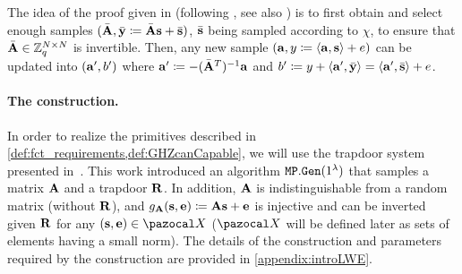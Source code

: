 {  The idea of the proof given in \cite[Lem.~2]{ACPS_2009_Fast_crypto_circular_enc} (following \cite{MR_2009_lattice_based_crypto}, see also \cite[p.~23]{peikert2016decade}) is to first obtain and select enough samples $(\bar{\mathbf{A}}, \bar{\mathbf{y}} \coloneqq \bar{\mathbf{A}} \mathbf{s} + \bar{\mathbf{s}})$, $\bar{\mathbf{s}}$ being sampled according to $\chi$, to ensure that $\bar{\mathbf{A}} \in \mathbb{Z}_q^{N \times N}$ is invertible. Then, any new sample $(\mathbf{a}, y \coloneqq \langle \mathbf{a}, \mathbf{s}\rangle + e)$ can be updated into $(\mathbf{a}', b')$ where $\mathbf{a}' \coloneqq -(\bar{\mathbf{A}}^T)^{-1}\mathbf{a}$ and $b' \coloneqq y + \langle \mathbf{a}', \bar{\mathbf{y}} \rangle = \langle \mathbf{a}', \bar{\mathbf{s}} \rangle + e$.
}

\paragraph{The \cite{MP11} construction.}

In order to realize the primitives described in \cref{def:fct_requirements,def:GHZcanCapable}, we will use the trapdoor system presented in~\cite{MP11}. This work introduced an algorithm ${\tt MP.Gen}(1^\lambda)$ that samples a matrix $\mathbf{A}$ and a trapdoor $\mathbf{R}$. In addition, $\mathbf{A}$ is indistinguishable from a random matrix (without $\mathbf{R}$), and $g_{\mathbf{A}}(\mathbf{s}, \mathbf{e}) \coloneqq \mathbf{A}\mathbf{s}+\mathbf{e}$ is injective and can be inverted given $\mathbf{R}$ for any $(\vect{s},\vect{e}) \in \ccX$ ($\ccX$ will be defined later as sets of elements having a small norm). The details of the construction and parameters required by the \cite{MP11} construction are provided in \cref{appendix:introLWE}.%

